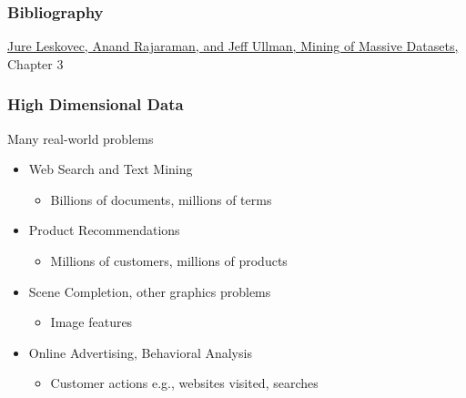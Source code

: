 \documentclass[svgnames]{beamer}
\subtitle{Efficient Similarity Search}
\begin{document}
\maketitle
\makeoutline

\begin{frame}
    \frametitle{Bibliography}
    \href{http://www.mmds.org}{Jure Leskovec, Anand Rajaraman, and Jeff Ullman, Mining of Massive Datasets,} Chapter 3
\end{frame}

\begin{frame} \frametitle{High Dimensional Data}
\begin{block}{Many real-world problems}
\begin{itemize}
\item Web Search and Text Mining
  \begin{itemize}
  \item Billions of documents, millions of terms
  \end{itemize}
\item Product Recommendations
  \begin{itemize}
  \item Millions of customers, millions of products
  \end{itemize}
\item Scene Completion, other graphics problems
  \begin{itemize}
  \item Image features
  \end{itemize}
\item Online Advertising, Behavioral Analysis
  \begin{itemize}
  \item Customer actions e.g., websites visited, searches
  \end{itemize}
\end{itemize}
\end{block}
\end{frame}

  
\end{document}
